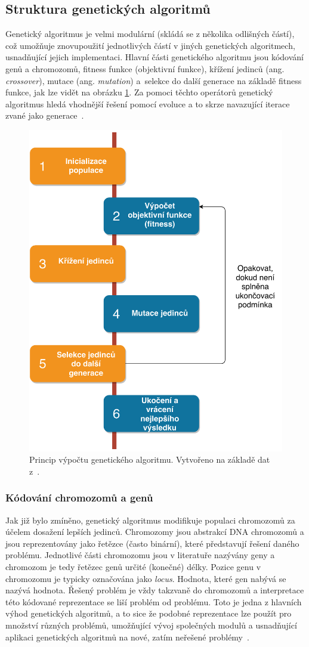 \subsection{Struktura genetických algoritmů}
Genetický algoritmus je velmi modulární (skládá se z několika odlišných částí), což umožňuje znovupoužití jednotlivých částí v jiných genetických algoritmech, usnadňující jejich implementaci. Hlavní části genetického algoritmu jsou kódování genů a chromozomů, fitness funkce (objektivní funkce), křížení jedinců (ang. \emph{crossover}), mutace (ang. \emph{mutation}) a~selekce do další generace na základě fitness funkce, jak lze vidět na obrázku \ref{fig:gaWorkflow}. Za pomoci těchto operátorů genetický algoritmus hledá vhodnější řešení pomocí evoluce a to skrze navazující iterace zvané jako generace~\cite{GAoptimisModel, introductionEvo}.

\begin{figure}[t]
    \centering
    \includegraphics[width=0.50\linewidth]{figures/slap_ea/geneticky_algoritmus.pdf}
    \caption{Princip výpočtu genetického algoritmu. Vytvořeno na základě dat z~\cite{GAoptimisModel}.}
    \label{fig:gaWorkflow}
\end{figure}

\subsubsection{Kódování chromozomů a genů}
Jak již bylo zmíněno, genetický algoritmus modifikuje populaci chromozomů za účelem dosažení lepších jedinců. Chromozomy jsou abstrakcí DNA chromozomů a jsou reprezentovány jako řetězce (často binární), které představují řešení daného problému. Jednotlivé části chromozomu jsou v literatuře nazývány geny a chromozom je tedy řetězec genů určité (konečné) délky. Pozice genu v chromozomu je typicky označována jako \emph{locus}. Hodnota, které gen nabývá se nazývá  hodnota. Řešený problém je vždy takzvaně  do chromozomů a interpretace této kódované reprezentace se liší problém od problému. Toto je jedna z hlavních výhod genetických algoritmů, a to sice že podobné reprezentace lze použít pro množství různých problémů, umožňující vývoj společných modulů a usnadňující aplikaci genetických algoritmů na nové, zatím neřešené problémy~\cite{GAoptimisModel, introductionEvo}.

